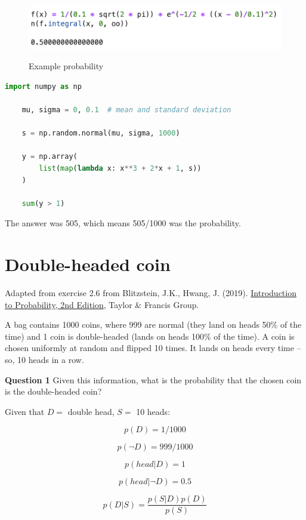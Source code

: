 \documentclass{article}
\begin{document}
\begin{enumerate}
    \begin{figure}[H]
        \centering
        \includegraphics[width=300 pt]{solution.png}
        \label{fig:my_label}
        \caption{Example probability}
    \end{figure} 

    \begin{lstlisting}[language=Python]
    import numpy as np

    mu, sigma = 0, 0.1  # mean and standard deviation

    s = np.random.normal(mu, sigma, 1000)

    y = np.array(
        list(map(lambda x: x**3 + 2*x + 1, s))
    )

    sum(y > 1)
    \end{lstlisting}

    The answer was 505, which means 505/1000 was the probability.


\end{enumerate}

\section{Double-headed coin}

Adapted from exercise 2.6 from Blitzstein, J.K., Hwang, J. (2019). \href{https://drive.google.com/file/d/1VmkAAGOYCTORq1wxSQqy255qLJjTNvBI/view}{Introduction to Probability, 2nd Edition}, Taylor \& Francis Group.

A bag contains 1000 coins, where 999 are normal (they land on heads 50\% of the time) and 1 coin is double-headed (lands on heads 100\% of the time). A coin is chosen uniformly at random and flipped 10 times. It lands on heads every time – so, 10 heads in a row.

\textbf{Question 1} Given this information, what is the probability that the chosen coin is the double-headed coin?

Given that $D = $ double head, $S = $ 10 heads:

$$p(D) = 1/1000$$

$$p(\neg D) = 999/1000$$

$$p(head | D) = 1$$

$$p(head | \neg D) = 0.5$$

$$p(D | S) = \frac{p(S | D) p(D)}{p(S)}$$
\end{document}
